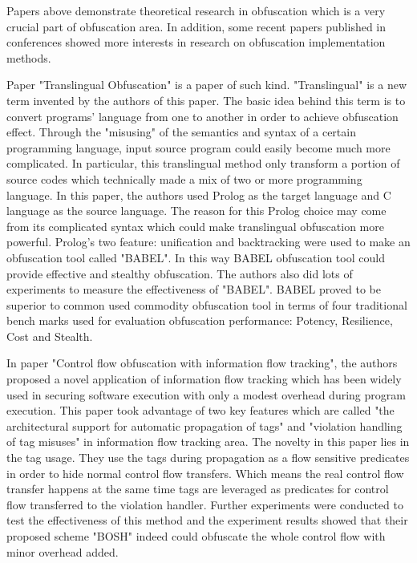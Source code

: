 \documentclass{sig-alternate-05-2015}
\begin{document}
Papers above demonstrate theoretical research in obfuscation which is a very crucial part of obfuscation area. In addition, some recent papers published in conferences showed more interests in research on obfuscation implementation methods.

Paper "Translingual Obfuscation"\cite{Wang:Translingual} is a paper of such kind. "Translingual" is a new term invented by the authors of this paper. The basic idea behind this term is to convert programs' language from one to another in order to achieve obfuscation effect. Through the "misusing" of the semantics and syntax of a certain programming language, input source program could easily become much more complicated. In particular, this translingual method only transform a portion of source codes which technically made a mix of two or more programming language. In this paper, the authors used Prolog as the target language and C language as the source language. The reason for this Prolog choice may come from its complicated syntax which could make translingual obfuscation more powerful.  Prolog's two feature: unification and backtracking were used to make an obfuscation tool called "BABEL". In this way BABEL obfuscation tool could provide effective and stealthy obfuscation. The authors also did lots of experiments to measure the effectiveness of "BABEL". BABEL proved to be superior to common used commodity obfuscation tool in terms of four traditional bench marks used for evaluation obfuscation performance: Potency, Resilience, Cost and Stealth.

In paper "Control flow obfuscation with information flow tracking"\cite{Chen:Control}, the authors proposed a novel application of information flow tracking which has been widely used in securing software execution with only a modest overhead during program execution. This paper took advantage of two key features which are called "the architectural support for automatic propagation of tags" and "violation handling of tag misuses" in information flow tracking area\cite{Chen:Control}. The novelty in this paper lies in the tag usage. They use the tags during propagation as a flow sensitive predicates in order to hide normal control flow transfers. Which means the real control flow transfer happens at the same time tags are leveraged as predicates for control flow transferred to the violation handler. Further experiments were conducted to test the effectiveness of this method and the experiment results showed that their proposed scheme "BOSH" indeed could obfuscate the whole control flow with minor overhead added.
\end{document}
